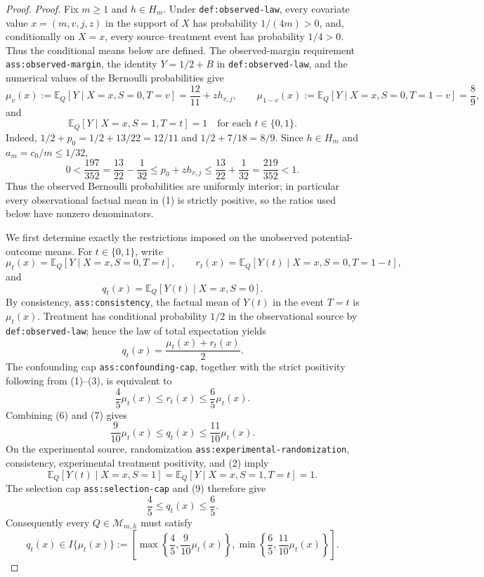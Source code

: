 \documentclass{article}
\begin{document}
\begin{proof}
\noindent\textit{Proof.}
Fix \(m\geq 1\) and \(h\in H_m\).  Under
\texttt{def:observed-law}, every covariate value
\(x=(m,v,j,z)\) in the support of \(X\) has probability
\(1/(4m)>0\), and, conditionally on \(X=x\), every source--treatment
event has probability \(1/4>0\).  Thus the conditional means below
are defined.  The observed-margin requirement
\texttt{ass:observed-margin}, the identity \(Y=1/2+B\) in
\texttt{def:observed-law}, and the numerical values of the Bernoulli
probabilities give
\[
 \mu_v(x):=\mathbb E_Q[Y\mid X=x,S=0,T=v]
     =\frac{12}{11}+z h_{v,j},
 \qquad
 \mu_{1-v}(x):=\mathbb E_Q[Y\mid X=x,S=0,T=1-v]
     =\frac89,
 \tag{1}
\]
and
\[
 \mathbb E_Q[Y\mid X=x,S=1,T=t]=1
 \quad\text{for each }t\in\{0,1\}.
 \tag{2}
\]
Indeed, \(1/2+p_0=1/2+13/22=12/11\) and
\(1/2+7/18=8/9\).  Since \(h\in H_m\) and
\(a_m=c_0/m\leq1/32\),
\[
 0<\frac{197}{352}
   =\frac{13}{22}-\frac1{32}
 \leq p_0+z h_{v,j}
 \leq\frac{13}{22}+\frac1{32}
   =\frac{219}{352}<1.
 \tag{3}
\]
Thus the observed Bernoulli probabilities are uniformly interior; in
particular every observational factual mean in (1) is strictly
positive, so the ratios used below have nonzero denominators.

We first determine exactly the restrictions imposed on the unobserved
potential-outcome means.  For \(t\in\{0,1\}\), write
\[
 \mu_t(x)=\mathbb E_Q[Y\mid X=x,S=0,T=t],\qquad
 r_t(x)=\mathbb E_Q[Y(t)\mid X=x,S=0,T=1-t],
 \tag{4}
\]
and
\[
 q_t(x)=\mathbb E_Q[Y(t)\mid X=x,S=0].
 \tag{5}
\]
By consistency, \texttt{ass:consistency}, the factual mean of
\(Y(t)\) in the event \(T=t\) is \(\mu_t(x)\).  Treatment has
conditional probability \(1/2\) in the observational source by
\texttt{def:observed-law}; hence the law of total expectation yields
\[
 q_t(x)=\frac{\mu_t(x)+r_t(x)}2.
 \tag{6}
\]
The confounding cap \texttt{ass:confounding-cap}, together with the
strict positivity following from (1)--(3), is equivalent to
\[
 \frac45\mu_t(x)\leq r_t(x)\leq\frac65\mu_t(x).
 \tag{7}
\]
Combining (6) and (7) gives
\[
 \frac9{10}\mu_t(x)\leq q_t(x)
     \leq\frac{11}{10}\mu_t(x).
 \tag{8}
\]
On the experimental source, randomization
\texttt{ass:experimental-randomization}, consistency, experimental
treatment positivity, and (2) imply
\[
 \mathbb E_Q[Y(t)\mid X=x,S=1]
 =\mathbb E_Q[Y\mid X=x,S=1,T=t]=1.
 \tag{9}
\]
The selection cap \texttt{ass:selection-cap} and (9) therefore give
\[
 \frac45\leq q_t(x)\leq\frac65.
 \tag{10}
\]
Consequently every \(Q\in\mathcal M_{m,h}\) must satisfy
\[
 q_t(x)\in I\{\mu_t(x)\}:=
 \left[
  \max\left\{\frac45,\frac9{10}\mu_t(x)\right\},
  \min\left\{\frac65,\frac{11}{10}\mu_t(x)\right\}
 \right].
 \tag{11}
\]


\end{proof}
\end{document}
